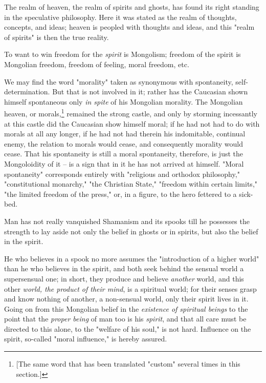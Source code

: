 \documentclass[a4paper]{book}
\begin{document}
The realm of heaven, the realm of spirits and ghosts, has found its right 
standing in the speculative philosophy. Here it was stated as the realm of 
thoughts, concepts, and ideas; heaven is peopled with thoughts and ideas, and 
this "{}realm of spirits"{} is then the true reality.

To want to win freedom for the \textit{spirit} is Mongolism; freedom of the 
spirit is Mongolian freedom, freedom of feeling, moral freedom, etc.

We may find the word "{}morality"{} taken as synonymous with spontaneity, 
self-determination. But that is not involved in it; rather has the Caucasian 
shown himself spontaneous only \textit{in spite} of his Mongolian morality. 
The Mongolian heaven, or morals,\footnote{[The same word that has been 
translated "{}custom"{} several times in this section.]} remained the strong 
castle, and only by storming incessantly at this castle did the Caucasian show 
himself moral; if he had not had to do with morals at all any longer, if he 
had not had therein his indomitable, continual enemy, the relation to morals 
would cease, and consequently morality would cease. That his spontaneity is 
still a moral spontaneity, therefore, is just the Mongoloidity of it -- is a 
sign that in it he has not arrived at himself. "{}Moral spontaneity"{} 
corresponds entirely with "{}religious and orthodox philosophy,"{} 
"{}constitutional monarchy,"{} "{}the Christian State,"{} "{}freedom within 
certain limits,"{} "{}the limited freedom of the press,"{} or, in a figure, to 
the hero fettered to a sick-bed.

Man has not really vanquished Shamanism and its spooks till he possesses the 
strength to lay aside not only the belief in ghosts or in spirits, but also 
the belief in the spirit.

He who believes in a spook no more assumes the "{}introduction of a higher 
world"{} than he who believes in the spirit, and both seek behind the sensual 
world a supersensual one; in short, they produce and believe \textit{another} 
world, and this other \textit{world, the product of their mind}, is a 
spiritual world; for their senses grasp and know nothing of another, a 
non-sensual world, only their spirit lives in it. Going on from this Mongolian 
belief in the \textit{existence of spiritual beings} to the point that the 
\textit{proper being} of man too is his \textit{spirit}, and that all care 
must be directed to this alone, to the "{}welfare of his soul,"{} is not hard. 
Influence on the spirit, so-called "{}moral influence,"{} is hereby assured.
\end{document}
